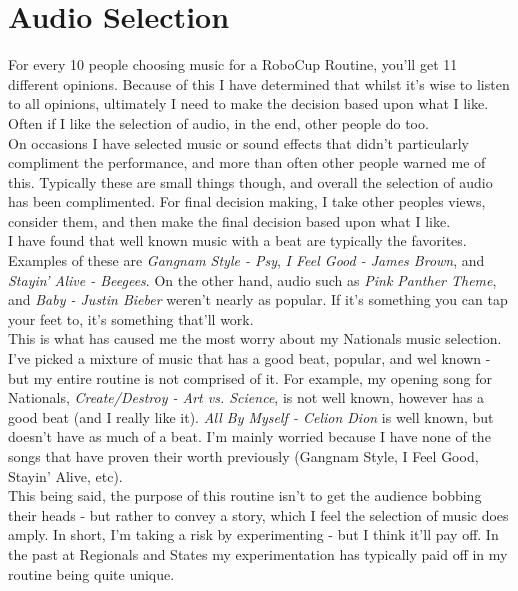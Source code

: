             
		\section{Audio Selection}
        	\label{sec:audio_selection}
        	For every 10 people choosing music for a RoboCup Routine, you'll get 11 different opinions. Because of this I have determined that whilst it's wise to listen to all opinions, ultimately I need to make the decision based upon what I like. Often if I like the selection of audio, in the end, other people do too.\\
            
            On occasions I have selected music or sound effects that didn't particularly compliment the performance, and more than often other people warned me of this. Typically these are small things though, and overall the selection of audio has been complimented. For final decision making, I take other peoples views, consider them, and then make the final decision based upon what I like.\\
            
            I have found that well known music with a beat are typically the favorites. Examples of these are \textit{Gangnam Style - Psy}, \textit{I Feel Good - James Brown}, and \textit{Stayin' Alive - Beegees}. On the other hand, audio such as \textit{Pink Panther Theme}, and \textit{Baby - Justin Bieber} weren't nearly as popular. If it's something you can tap your feet to, it's something that'll work.\\
            
            This is what has caused me the most worry about my Nationals music selection. I've picked a mixture of music that has a good beat, popular, and wel known - but my entire routine is not comprised of it. For example, my opening song for Nationals, \textit{Create/Destroy - Art vs. Science}, is not well known, however has a good beat (and I really like it). \textit{All By Myself - Celion Dion} is well known, but doesn't have as much of a beat. I'm mainly worried because I have none of the songs that have proven their worth previously (Gangnam Style, I Feel Good, Stayin' Alive, etc).\\
            
            This being said, the purpose of this routine isn't to get the audience bobbing their heads - but rather to convey a story, which I feel the selection of music does amply. In short, I'm taking a risk by experimenting - but I think it'll pay off. In the past at Regionals and States my experimentation has typically paid off in my routine being quite unique.\\
            
